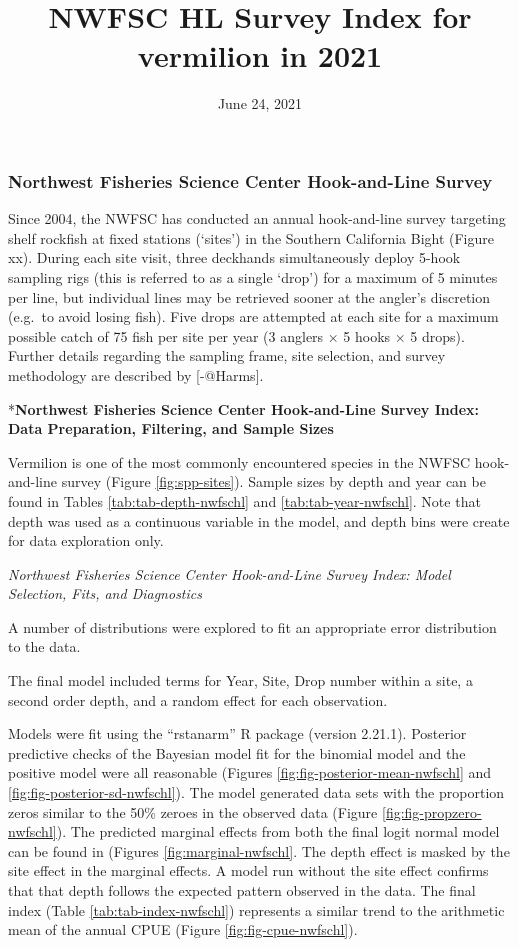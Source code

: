 \documentclass[
]{article}
\title{NWFSC HL Survey Index for vermilion in 2021}
\author{}
\date{\vspace{-2.5em}June 24, 2021}
\begin{document}
\maketitle

{
\setcounter{tocdepth}{2}
\tableofcontents
}
\hypertarget{northwest-fisheries-science-center-hook-and-line-survey}{%
\subsubsection{Northwest Fisheries Science Center Hook-and-Line Survey}\label{northwest-fisheries-science-center-hook-and-line-survey}}

Since 2004, the NWFSC has conducted an annual hook-and-line survey targeting shelf rockfish at fixed stations (`sites') in the Southern California Bight (Figure xx). During each site visit, three deckhands simultaneously deploy 5-hook sampling rigs (this is referred to as a single `drop') for a maximum of 5 minutes per line, but individual lines may be retrieved sooner at the angler's discretion (e.g.~to avoid losing fish). Five drops are attempted at each site for a maximum possible catch of 75 fish per site per year (3 anglers × 5 hooks × 5 drops). Further details regarding the sampling frame, site selection, and survey methodology are described by {[}-@Harms{]}.

*\textbf{Northwest Fisheries Science Center Hook-and-Line Survey Index: Data Preparation, Filtering, and Sample Sizes}

Vermilion is one of the most commonly encountered species in the NWFSC hook-and-line survey (Figure \ref{fig:spp-sites}). Sample sizes by depth and year can be found in Tables
\ref{tab:tab-depth-nwfschl} and \ref{tab:tab-year-nwfschl}.
Note that depth was used as a continuous variable in the model, and depth bins were create for data exploration only.

\emph{Northwest Fisheries Science Center Hook-and-Line Survey Index: Model Selection, Fits, and Diagnostics}

A number of distributions were explored to fit an appropriate error distribution to
the data.

The final model included terms for Year, Site, Drop number within a site, a
second order depth, and a random effect for each observation.

Models were fit using the ``rstanarm'' R package (version 2.21.1). Posterior predictive
checks of the Bayesian model fit for the binomial model and the positive model
were all reasonable (Figures \ref{fig:fig-posterior-mean-nwfschl} and
\ref{fig:fig-posterior-sd-nwfschl}). The model generated data sets with the
proportion zeros similar to the 50\% zeroes in the observed data
(Figure \ref{fig:fig-propzero-nwfschl}). The predicted marginal effects from
both the final logit normal model can be found in (Figures \ref{fig:marginal-nwfschl}.
The depth effect is masked by the site effect in the marginal effects. A model
run without the site effect confirms that that depth follows the expected pattern
observed in the data.
The final index (Table \ref{tab:tab-index-nwfschl})
represents a similar trend to the arithmetic mean of the annual CPUE (Figure \ref{fig:fig-cpue-nwfschl}).
\end{document}
